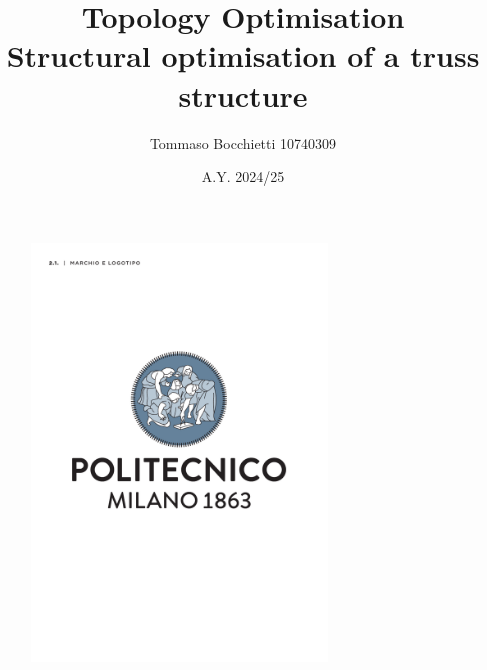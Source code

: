 \documentclass{assignment}
\begin{document}
\title{Topology Optimisation \\ Structural optimisation of a truss structure}
\author{Tommaso Bocchietti 10740309}
\date{A.Y. 2024/25}

\maketitle

\begin{figure}[H]
    \centering
    \includegraphics[width=0.7\textwidth]{./pdf/Polimi_logo_coverpage.pdf}
    \label{fig:Polimi_logo}
\end{figure}

\clearpage
\tableofcontents
\listoffigures
\listoftables
\lstlistoflistings

\clearpage




% 
% 
\end{document}
